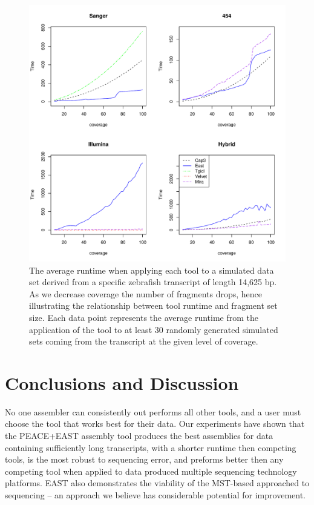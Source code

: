 \documentclass{bioinfo}
\newcommand{\east} {{\small EAST}}
\newcommand{\peast}{{\small PEACE+EAST}}
\begin{document}
\begin{figure}[htb]
\centerline{\includegraphics[width=6in]{pics.d/runtime_bycoverage_all.pdf}}
\caption{The average runtime when applying each tool to a simulated
  data set derived from a specific zebrafish transcript of length
  14,625 bp.  As we decrease coverage the number of fragments drops,
  hence illustrating the relationship between tool runtime and
  fragment set size.  Each data point represents the average runtime
  from the application of the tool to at least 30 randomly generated
  simulated sets coming from the transcript at the given level of
  coverage.}
\label{runtime.coverage}
\end{figure}

\section*{Conclusions and Discussion}

No one assembler can consistently out performs all other tools, and a
user must choose the tool that works best for their data.  Our
experiments have shown that the \peast\/ assembly tool produces the
best assemblies for data containing sufficiently long transcripts,
with a shorter runtime then competing tools, is the most robust to
sequencing error, and preforms better then any competing tool when
applied to data produced multiple sequencing technology platforms.
\east\/ also demonstrates the viability of the MST-based approached to
sequencing -- an approach we believe has considerable potential for
improvement.
\end{document}

